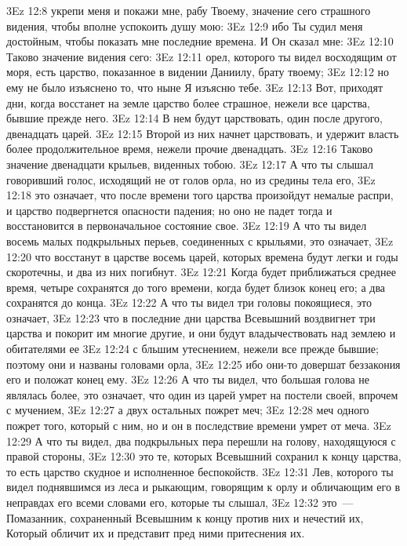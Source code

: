\vs 3Ez 12:8 укрепи меня и покажи мне, рабу Твоему, значение сего страшного видения, чтобы вполне успокоить душу мою:
\vs 3Ez 12:9 ибо Ты судил меня достойным, чтобы показать мне последние времена. И Он сказал мне:
\vs 3Ez 12:10 Таково значение видения сего:
\vs 3Ez 12:11 орел, которого ты видел восходящим от моря, есть царство, показанное в видении Даниилу, брату твоему;
\vs 3Ez 12:12 но ему не было изъяснено то, что ныне Я изъясню тебе.
\vs 3Ez 12:13 Вот, приходят дни, когда восстанет на земле царство более страшное, нежели все царства, бывшие прежде него.
\vs 3Ez 12:14 В нем будут царствовать, один после другого, двенадцать царей.
\vs 3Ez 12:15 Второй из них начнет царствовать, и удержит власть более продолжительное время, нежели прочие двенадцать.
\vs 3Ez 12:16 Таково значение двенадцати крыльев, виденных тобою.
\vs 3Ez 12:17 А что ты слышал говоривший голос, исходящий не от голов орла, но из средины тела его,
\vs 3Ez 12:18 это означает, что после времени того царства произойдут немалые распри, и царство подвергнется опасности падения; но оно не падет тогда и восстановится в первоначальное состояние свое.
\vs 3Ez 12:19 А что ты видел восемь малых подкрыльных перьев, соединенных с крыльями, это означает,
\vs 3Ez 12:20 что восстанут в царстве восемь царей, которых времена будут легки и годы скоротечны, и два из них погибнут.
\vs 3Ez 12:21 Когда будет приближаться среднее время, четыре сохранятся до того времени, когда будет близок конец его; а два сохранятся до конца.
\vs 3Ez 12:22 А что ты видел три головы покоящиеся, это означает,
\vs 3Ez 12:23 что в последние дни царства Всевышний воздвигнет три царства и покорит им многие другие, и они будут владычествовать над землею и обитателями ее
\vs 3Ez 12:24 с бльшим утеснением, нежели все прежде бывшие; поэтому они и названы головами орла,
\vs 3Ez 12:25 ибо они-то довершат беззакония его и положат конец ему.
\vs 3Ez 12:26 А что ты видел, что большая голова не являлась более, это означает, что один из царей умрет на постели своей, впрочем с мучением,
\vs 3Ez 12:27 а двух остальных пожрет меч;
\vs 3Ez 12:28 меч одного пожрет того, который с ним, но и он в последствие времени умрет от меча.
\vs 3Ez 12:29 А что ты видел, два подкрыльных пера перешли на голову, находящуюся с правой стороны,
\vs 3Ez 12:30 это те, которых Всевышний сохранил к концу царства, то есть царство скудное и исполненное беспокойств.
\vs 3Ez 12:31 Лев, которого ты видел поднявшимся из леса и рыкающим, говорящим к орлу и обличающим его в неправдах его всеми словами его, которые ты слышал,
\vs 3Ez 12:32 это~--- Помазанник, сохраненный Всевышним к концу против них и нечестий их, Который обличит их и представит пред ними притеснения их.
